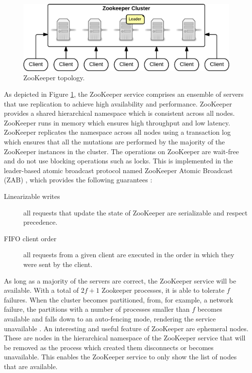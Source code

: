 \begin{figure}[ht!]
\centering
\includegraphics[width=.9\textwidth]{figures/zookeeper.png}
\caption{ZooKeeper topology. \label{fig:ZooKeeper}}
\end{figure}

As depicted in Figure \ref{fig:ZooKeeper}, the ZooKeeper service comprises an ensemble of servers that use replication to achieve high availability and performance. ZooKeeper provides a shared hierarchical namespace which is consistent across all nodes. ZooKeeper runs in memory which ensures high throughput and low latency. ZooKeeper replicates the namespace across all nodes using a transaction log which ensures that all the mutations are performed by the majority of the ZooKeeper instances in the cluster. The operations on ZooKeeper are wait-free and do not use blocking operations such as locks. This is implemented in the leader-based atomic broadcast protocol named ZooKeeper Atomic Broadcast (ZAB) \cite{zab}, which provides the following guarantees \cite{Hunt:2010}:
\begin{description} 
    \item[Linearizable writes] all requests that update the state of ZooKeeper are serializable and respect precedence.
    \item[FIFO client order] all requests from a given client are executed in the order in which they were sent by the client.
\end{description}

As long as a majority of the servers are correct, the ZooKeeper service will be available. With a total of $2f+1$ Zookeeper processes, it is able to tolerate $f$ failures. When the cluster becomes partitioned, from, for example, a network failure, the partitions with a number of processes smaller than $f$ becomes available and falls down to an auto-fencing mode, rendering the service unavailable \cite{0201619180}. An interesting and useful feature of ZooKeeper are ephemeral nodes. These are nodes in the hierarchical namespace of the ZooKeeper service that will be removed as the process which created them disconnects or becomes unavailable. This enables the ZooKeeper service to only show the list of nodes that are available.

